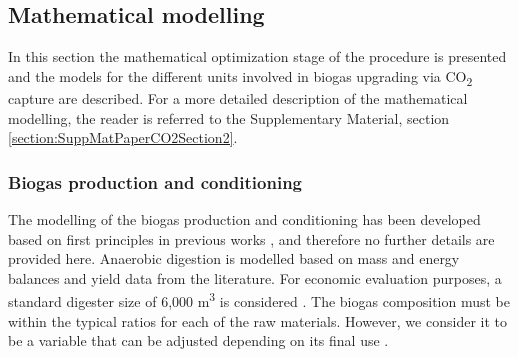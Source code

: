 \begin{refsection}[referencesCh7]
\begin{table}[h]
	\centering
	\caption{CO\textsubscript{2} capture technologies considered in the study.}
	\label{table:Ch7Table2}
\end{table}

\subsection{Mathematical modelling}
In this section the mathematical optimization stage of the procedure is presented and the models for the different units involved in biogas upgrading via CO\textsubscript{2} capture are described. For a more detailed description of the mathematical modelling, the reader is referred to the Supplementary Material, section \ref{section:SuppMatPaperCO2Section2}.

\subsubsection{Biogas production and conditioning} \label{section:BiogasProductionPaperBiogas}
The modelling of the biogas production and conditioning has been developed based on first principles in previous works \citet{leon2016optimal}, and therefore no further details are provided here. Anaerobic digestion is modelled based on mass and energy balances and yield data from the literature. For economic evaluation purposes, a standard digester size of 6,000 m\textsuperscript{3} is considered \citep{rohstoffe2010guia}. The biogas composition must be within the typical ratios for each of the raw materials. However, we consider it to be a variable that can be adjusted depending on its final use \citep{leon2016optimal}.


\end{refsection}
